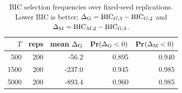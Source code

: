 \begin{table}[t]
\centering
\small
\caption{BIC selection frequencies over fixed-seed replications. Lower BIC is better; $\Delta_{\rm G}=\mathrm{BIC}_{G,3}-\mathrm{BIC}_{G,2}$ and $\Delta_{\rm M}=\mathrm{BIC}_{M,2}-\mathrm{BIC}_{G,3}$.}
\label{tab:replications}
\begin{tabular}{rrrrr}
\toprule
$T$ & reps & mean $\Delta_{\rm G}$ & Pr$(\Delta_{\rm G}<0)$ & Pr$(\Delta_{\rm M}<0)$\\
\midrule
500 & 200 & -56.2 & 0.895 & 0.940\\
1500 & 200 & -237.0 & 0.945 & 0.985\\
5000 & 200 & -893.4 & 0.960 & 0.985\\
\bottomrule
\end{tabular}
\end{table}
